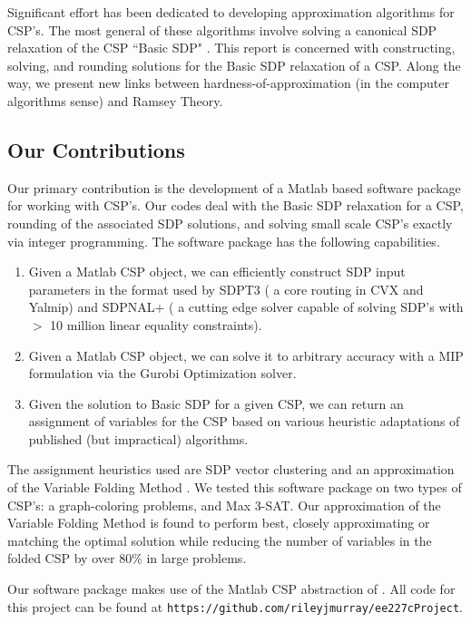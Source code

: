\documentclass[12pt]{article} %
\begin{document}
Significant effort has been dedicated to developing approximation algorithms for CSP's. The most general of these algorithms involve solving a canonical SDP relaxation of the CSP ``Basic SDP" \cite{raghavendra2008optimal}. This report is concerned with constructing, solving, and rounding solutions for the Basic SDP relaxation of a CSP. Along the way, we present new links between hardness-of-approximation (in the computer algorithms sense) and Ramsey Theory.

\subsection{Our Contributions}

Our primary contribution is the development of a Matlab based software package for working with CSP's. Our codes deal with the Basic SDP relaxation for a CSP, rounding of the associated SDP solutions, and solving small scale CSP's exactly via integer programming. The software package has the following capabilities.

\begin{enumerate}
\item Given a Matlab CSP object, we can efficiently construct SDP input parameters in the format used by SDPT3 ( a core routing in CVX and Yalmip) and SDPNAL+ ( a cutting edge solver capable of solving SDP's with $>$ 10 million linear equality constraints).

\item Given a Matlab CSP object, we can solve it to arbitrary accuracy with a MIP formulation via the Gurobi Optimization solver.

\item Given the solution to Basic SDP for a given CSP, we can return an assignment of variables for the CSP based on various heuristic adaptations of published (but impractical) algorithms.
\end{enumerate}

The assignment heuristics used are SDP vector clustering and an approximation of the Variable Folding Method \citep{raghavendra2009round}. We tested this software package on two types of CSP's: a graph-coloring problems, and Max 3-SAT. Our approximation of the Variable Folding Method is found to perform best, closely approximating or matching the optimal solution while reducing the number of variables in the folded CSP by over 80\% in large problems. 

Our software package makes use of the Matlab CSP abstraction of \cite{dwivedi2015introduction}. All code for this project can be found at \texttt{https://github.com/rileyjmurray/ee227cProject}.
\end{document}
